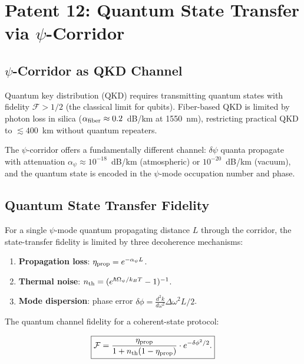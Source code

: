 \documentclass[aps,prd,twocolumn,superscriptaddress,nofootinbib]{revtex4-2}
\newcommand{\Opsi}{\Omega_\psi}
\begin{document}
\section{Patent 12: Quantum State Transfer via $\psi$-Corridor}
\label{sec:qkd}

\subsection{$\psi$-Corridor as QKD Channel}

Quantum key distribution (QKD) requires transmitting quantum states
with fidelity $\mathcal{F} > 1/2$ (the classical limit for qubits).
Fiber-based QKD is limited by photon loss in silica
($\alpha_{\rm fiber} \approx 0.2$~dB/km at 1550~nm), restricting
practical QKD to $\lesssim 400$~km without quantum repeaters.

The $\psi$-corridor offers a fundamentally different channel:
$\delta\psi$ quanta propagate with attenuation
$\alpha_\psi \approx 10^{-18}$~dB/km (atmospheric) or
$10^{-20}$~dB/km (vacuum), and the quantum state is encoded in the
$\psi$-mode occupation number and phase.

\subsection{Quantum State Transfer Fidelity}

For a single $\psi$-mode quantum propagating distance $L$ through
the corridor, the state-transfer fidelity is limited by three
decoherence mechanisms:

\begin{enumerate}
\item \textbf{Propagation loss}: $\eta_{\rm prop} = e^{-\alpha_\psi L}$.
\item \textbf{Thermal noise}: $n_{\rm th} = (e^{\hbar\Opsi/k_BT}-1)^{-1}$.
\item \textbf{Mode dispersion}: phase error
$\delta\phi = \frac{d^2k}{d\omega^2}\Delta\omega^2 L/2$.
\end{enumerate}

The quantum channel fidelity for a coherent-state protocol:

\begin{equation}
\boxed{
\mathcal{F} = \frac{\eta_{\rm prop}}{1 + n_{\rm th}(1-\eta_{\rm prop})}
\cdot e^{-\delta\phi^2/2}.
}
\label{eq:fidelity}
\end{equation}
\end{document}
